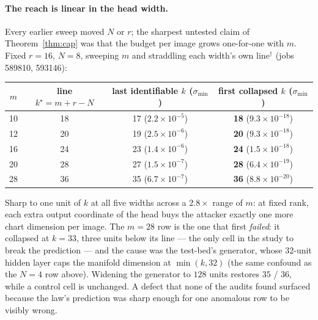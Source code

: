 \paragraph{The reach is linear in the head width.} Every earlier sweep moved
$N$ or $r$; the sharpest untested claim of Theorem~\ref{thm:cap} was that
the budget per image grows one-for-one with $m$. Fixed $r=16$, $N=8$,
sweeping $m$ and straddling each width's own line$^\dagger$ (jobs 589810,
593146):
\begin{center}\small
\begin{tabular}{@{}cccc@{}}\toprule
$m$ & line $k^\star=m+r-N$ & last identifiable $k$ ($\sigma_{\min}$) & first collapsed $k$ ($\sigma_{\min}$)\\ \midrule
10 & 18 & 17 ($2.2\times10^{-5}$) & \textbf{18} ($9.3\times10^{-18}$)\\
12 & 20 & 19 ($2.5\times10^{-6}$) & \textbf{20} ($9.3\times10^{-18}$)\\
16 & 24 & 23 ($1.4\times10^{-6}$) & \textbf{24} ($1.5\times10^{-18}$)\\
20 & 28 & 27 ($1.5\times10^{-7}$) & \textbf{28} ($6.4\times10^{-19}$)\\
28 & 36 & 35 ($6.7\times10^{-7}$) & \textbf{36} ($8.8\times10^{-20}$)\\ \bottomrule
\end{tabular}
\end{center}
Sharp to one unit of $k$ at all five widths across a $2.8\times$ range of
$m$: at fixed rank, each extra output coordinate of the head buys the
attacker exactly one more chart dimension per image. The $m=28$ row is the
one that first \emph{failed}: it collapsed at $k=33$, three units below its
line — the only cell in the study to break the prediction — and the cause
was the test-bed's generator, whose $32$-unit hidden layer caps the
manifold dimension at $\min(k,32)$ (the same confound as the $N=4$ row
above). Widening the generator to $128$ units restores $35$ / $36$, while a
control cell is unchanged. A defect that none of the audits found surfaced
because the law's prediction was sharp enough for one anomalous row to be
visibly wrong.

